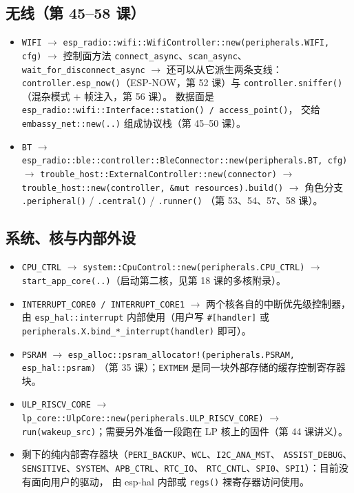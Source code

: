 \documentclass[UTF8,a4paper,11pt,fontset=fandol]{ctexart}
\newcommand{\fld}[1]{\texttt{#1}}
\begin{document}
\subsection{无线（第 45--58 课）}
\begin{itemize}
  \item \fld{WIFI} $\rightarrow$ \fld{esp\_radio::wifi::WifiController::new(peripherals.WIFI, cfg)}
    $\rightarrow$ 控制面方法 \fld{connect\_async}、\fld{scan\_async}、\fld{wait\_for\_disconnect\_async}
    $\rightarrow$ 还可以从它派生两条支线：
    \fld{controller.esp\_now()}（ESP-NOW，第 52 课）与
    \fld{controller.sniffer()}（混杂模式 + 帧注入，第 56 课）。
    数据面是 \fld{esp\_radio::wifi::Interface::station() / access\_point()}，
    交给 \fld{embassy\_net::new(..)} 组成协议栈（第 45--50 课）。
  \item \fld{BT} $\rightarrow$ \fld{esp\_radio::ble::controller::BleConnector::new(peripherals.BT, cfg)}
    $\rightarrow$ \fld{trouble\_host::ExternalController::new(connector)}
    $\rightarrow$ \fld{trouble\_host::new(controller, \&mut resources).build()}
    $\rightarrow$ 角色分支 \fld{.peripheral()} / \fld{.central()} / \fld{.runner()}
    （第 53、54、57、58 课）。
\end{itemize}

\subsection{系统、核与内部外设}
\begin{itemize}
  \item \fld{CPU\_CTRL} $\rightarrow$ \fld{system::CpuControl::new(peripherals.CPU\_CTRL)}
    $\rightarrow$ \fld{start\_app\_core(..)}（启动第二核，见第 18 课的多核附录）。
  \item \fld{INTERRUPT\_CORE0 / INTERRUPT\_CORE1} $\rightarrow$ 两个核各自的中断优先级控制器，
    由 \fld{esp\_hal::interrupt} 内部使用（用户写 \fld{\#[handler]} 或
    \fld{peripherals.X.bind\_*\_interrupt(handler)} 即可）。
  \item \fld{PSRAM} $\rightarrow$ \fld{esp\_alloc::psram\_allocator!(peripherals.PSRAM, esp\_hal::psram)}
    （第 35 课）；\fld{EXTMEM} 是同一块外部存储的缓存控制寄存器块。
  \item \fld{ULP\_RISCV\_CORE} $\rightarrow$ \fld{lp\_core::UlpCore::new(peripherals.ULP\_RISCV\_CORE)}
    $\rightarrow$ \fld{run(wakeup\_src)}；需要另外准备一段跑在 LP 核上的固件（第 44 课讲义）。
  \item 剩下的纯内部寄存器块（\fld{PERI\_BACKUP}、\fld{WCL}、\fld{I2C\_ANA\_MST}、
    \fld{ASSIST\_DEBUG}、\fld{SENSITIVE}、\fld{SYSTEM}、\fld{APB\_CTRL}、\fld{RTC\_IO}、
    \fld{RTC\_CNTL}、\fld{SPI0}、\fld{SPI1}）：目前没有面向用户的驱动，
    由 esp-hal 内部或 \fld{regs()} 裸寄存器访问使用。
\end{itemize}
\end{document}
